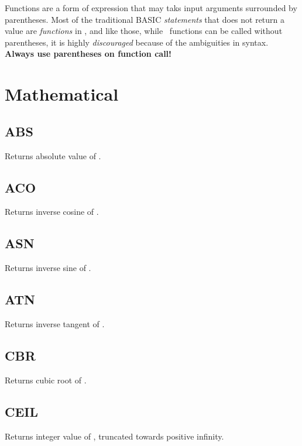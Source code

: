 \label{functions}

Functions are a form of expression that may taks input arguments surrounded by parentheses. Most of the traditional BASIC \emph{statements} that does not return a value are \emph{functions} in \tbas , and like those, while \tbas\ functions can be called without parentheses, it is highly \emph{discouraged} because of the ambiguities in syntax. \textbf{Always use parentheses on function call!}

\section{Mathematical}

    \subsection{ABS}
        \par
        Returns absolute value of .
    \subsection{ACO}
        \par
        Returns inverse cosine of .
    \subsection{ASN}
        \par
        Returns inverse sine of .
    \subsection{ATN}
        \par
        Returns inverse tangent of .
    \subsection{CBR}
        \par
        Returns cubic root of .
    \subsection{CEIL}
        \par
        Returns integer value of , truncated towards positive infinity.
